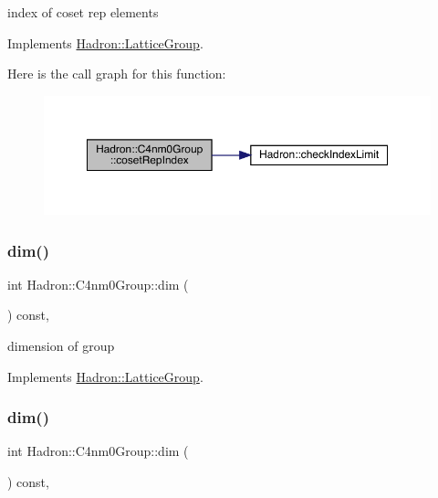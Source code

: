 index of coset rep elements 

Implements \mbox{\hyperlink{structHadron_1_1LatticeGroup_a7e3b9b5e2f596e6c40d64aa939a3ad6c}{Hadron\+::\+Lattice\+Group}}.

Here is the call graph for this function\+:
\nopagebreak
\begin{figure}[H]
\begin{center}
\leavevmode
\includegraphics[width=350pt]{da/da1/structHadron_1_1C4nm0Group_abac118ef8b96cecf62143c917e23736e_cgraph}
\end{center}
\end{figure}
\mbox{\label{structHadron_1_1C4nm0Group_adc1a59b08c4fafae324e82e8ded86919}} 
\subsubsection{\texorpdfstring{dim()}{dim()}\hspace{0.1cm}{\footnotesize\ttfamily [1/2]}}
{\footnotesize\ttfamily int Hadron\+::\+C4nm0\+Group\+::dim (\begin{DoxyParamCaption}{ }\end{DoxyParamCaption}) const\hspace{0.3cm}{\ttfamily [inline]}, {\ttfamily [virtual]}}

dimension of group 

Implements \mbox{\hyperlink{structHadron_1_1LatticeGroup_abd8415698323796ef6a8605796ee3bea}{Hadron\+::\+Lattice\+Group}}.

\mbox{\label{structHadron_1_1C4nm0Group_adc1a59b08c4fafae324e82e8ded86919}} 
\subsubsection{\texorpdfstring{dim()}{dim()}\hspace{0.1cm}{\footnotesize\ttfamily [2/2]}}
{\footnotesize\ttfamily int Hadron\+::\+C4nm0\+Group\+::dim (\begin{DoxyParamCaption}{ }\end{DoxyParamCaption}) const\hspace{0.3cm}{\ttfamily [inline]}, {\ttfamily [virtual]}}

